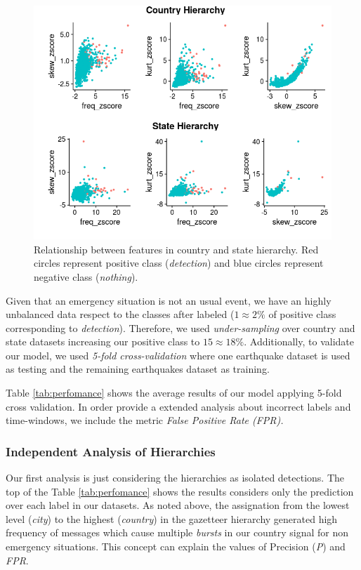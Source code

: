 \documentclass[sigconf]{acmart}
\begin{document}
\begin{figure}
	\centering
	\includegraphics[width=\columnwidth]{img/scatter.png}
	\caption{Relationship between features in country and state hierarchy. Red circles represent positive class (\textit{detection}) and blue circles represent negative class (\textit{nothing}).}
	\label{fig:scatter}
\end{figure}


Given that an emergency situation is not an usual event, we have an highly unbalanced data respect to the classes after labeled ($1\approx2\%$ of positive class corresponding to \textit{detection}). Therefore, we used \textit{under-sampling} \cite{lunardon2014rose} over country and state datasets increasing our positive class to $15\approx18\%$. Additionally, to validate our model, we used \textit{5-fold cross-validation} where one earthquake dataset is used as testing and the remaining earthquakes dataset as training.

Table \ref{tab:perfomance} shows the average results of our model applying 5-fold cross validation. In order provide a extended analysis about incorrect labels and time-windows, we include the metric \textit{False Positive Rate (FPR).} 


\subsubsection{Independent Analysis of Hierarchies} 
Our first analysis is just considering the hierarchies as isolated detections. The top of the Table \ref{tab:perfomance} shows the results considers only the prediction over each label in our datasets. As noted above, the assignation from the lowest level (\textit{city}) to the highest (\textit{country}) in the gazetteer hierarchy generated high frequency of messages which cause multiple \textit{bursts} in our country signal for non  emergency situations. This concept can explain the values of Precision (\textit{P}) and \textit{FPR}.
\end{document}
